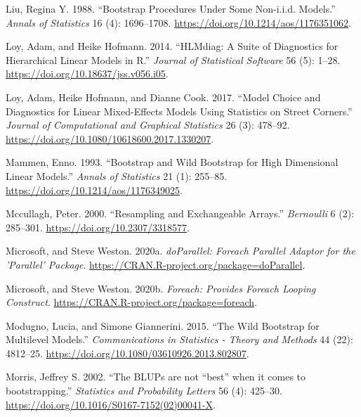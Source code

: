\begin{CSLReferences}{1}{0}
\leavevmode{}%
Liu, Regina Y. 1988. {``Bootstrap Procedures Under Some Non-i.i.d. Models.''} \emph{Annals of Statistics} 16 (4): 1696--1708. \url{https://doi.org/10.1214/aos/1176351062}.

\leavevmode{}%
Loy, Adam, and Heike Hofmann. 2014. {``{HLMdiag}: A Suite of Diagnostics for Hierarchical Linear Models in {R}.''} \emph{Journal of Statistical Software} 56 (5): 1--28. \url{https://doi.org/10.18637/jss.v056.i05}.

\leavevmode{}%
Loy, Adam, Heike Hofmann, and Dianne Cook. 2017. {``Model Choice and Diagnostics for Linear {Mixed-Effects} Models Using Statistics on Street Corners.''} \emph{Journal of Computational and Graphical Statistics} 26 (3): 478--92. \url{https://doi.org/10.1080/10618600.2017.1330207}.

\leavevmode{}%
Mammen, Enno. 1993. {``Bootstrap and Wild Bootstrap for High Dimensional Linear Models.''} \emph{Annals of Statistics} 21 (1): 255--85. \url{https://doi.org/10.1214/aos/1176349025}.

\leavevmode{}%
Mccullagh, Peter. 2000. {``Resampling and Exchangeable Arrays.''} \emph{Bernoulli} 6 (2): 285--301. \url{https://doi.org/10.2307/3318577}.

\leavevmode{}%
Microsoft, and Steve Weston. 2020a. \emph{doParallel: Foreach Parallel Adaptor for the 'Parallel' Package}. \url{https://CRAN.R-project.org/package=doParallel}.

\leavevmode{}%
Microsoft, and Steve Weston. 2020b. \emph{Foreach: Provides Foreach Looping Construct}. \url{https://CRAN.R-project.org/package=foreach}.

\leavevmode{}%
Modugno, Lucia, and Simone Giannerini. 2015. {``The Wild Bootstrap for Multilevel Models.''} \emph{Communications in Statistics - Theory and Methods} 44 (22): 4812--25. \url{https://doi.org/10.1080/03610926.2013.802807}.

\leavevmode{}%
Morris, Jeffrey S. 2002. {``{The BLUPs are not {``}best{''} when it comes to bootstrapping}.''} \emph{Statistics and Probability Letters} 56 (4): 425--30. \url{https://doi.org/10.1016/S0167-7152(02)00041-X}.


\end{CSLReferences}
